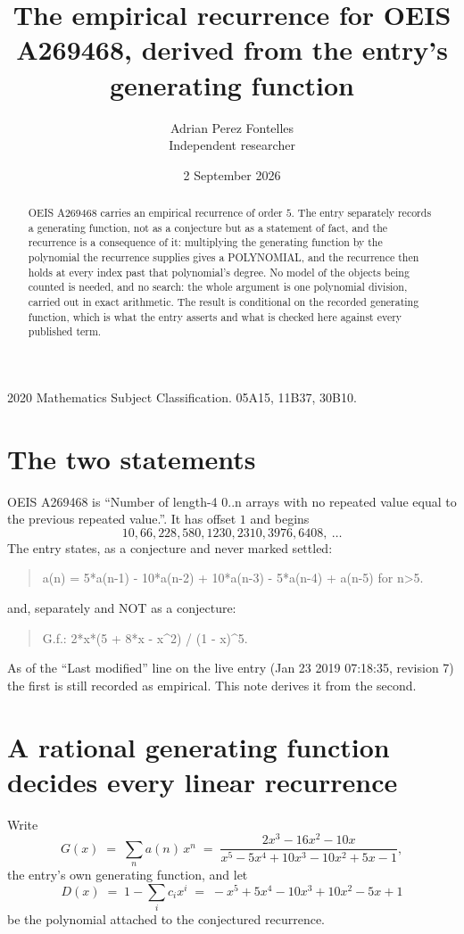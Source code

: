 \documentclass[11pt,a4paper]{article}
\title{The empirical recurrence for OEIS A269468, derived from the entry's generating function}
\author{Adrian Perez Fontelles\\ \small Independent researcher}
\date{2 September 2026}
\theoremstyle{plain}
\theoremstyle{definition}
\begin{document}
\maketitle

\begin{abstract}
OEIS A269468 carries an empirical recurrence of order $5$. The entry separately records a
generating function, not as a conjecture but as a statement of fact, and the recurrence is a
consequence of it: multiplying the generating function by the polynomial the recurrence
supplies gives a POLYNOMIAL, and the recurrence then holds at every index past that
polynomial's degree. No model of the objects being counted is needed, and no search: the
whole argument is one polynomial division, carried out in exact arithmetic. The result is
conditional on the recorded generating function, which is what the entry asserts and what is
checked here against every published term.
\end{abstract}

\noindent\small 2020 Mathematics Subject Classification. 05A15, 11B37, 30B10.\normalsize

\section{The two statements}

OEIS A269468 is ``Number of length-4 0..n arrays with no repeated value equal to the previous repeated value.''. It has offset $1$ and begins
\[
10, 66, 228, 580, 1230, 2310, 3976, 6408,\ \dots
\]
The entry states, as a conjecture and never marked settled:
\begin{quote}
a(n) = 5*a(n-1) - 10*a(n-2) + 10*a(n-3) - 5*a(n-4) + a(n-5) for n>5.
\end{quote}
and, separately and NOT as a conjecture:
\begin{quote}
G.f.: 2*x*(5 + 8*x - x\^{}2) / (1 - x)\^{}5.
\end{quote}
As of the ``Last modified'' line on the live entry (Jan 23 2019 07:18:35, revision 7) the first is still
recorded as empirical. This note derives it from the second.

\section{A rational generating function decides every linear recurrence}

Write
\[
G(x)\;=\;\sum_{n}a(n)\,x^{n}\;=\;\frac{2 x^{3} - 16 x^{2} - 10 x}{x^{5} - 5 x^{4} + 10 x^{3} - 10 x^{2} + 5 x - 1},
\]
the entry's own generating function, and let
\[
D(x)\;=\;1-\sum_i c_i x^{i}\;=\;- x^{5} + 5 x^{4} - 10 x^{3} + 10 x^{2} - 5 x + 1
\]
be the polynomial attached to the conjectured recurrence.
\end{document}
